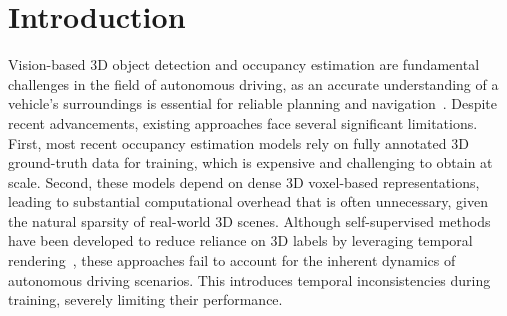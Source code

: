 \documentclass[10pt,twocolumn,letterpaper]{article}
\begin{document}
\section{Introduction}
Vision-based 3D object detection and occupancy estimation are fundamental challenges in the field of autonomous driving, as an accurate understanding of a vehicle's surroundings is essential for reliable planning and navigation~\cite{xu2025survey, shi2024grid, zhang2024vision}.
Despite recent advancements, existing approaches face several significant limitations.
First, most recent occupancy estimation models rely on fully annotated 3D ground-truth data for training, which is expensive and challenging to obtain at scale.
Second, these models depend on dense 3D voxel-based representations, leading to substantial computational overhead that is often unnecessary, given the natural sparsity of real-world 3D scenes.
Although self-supervised methods have been developed to reduce reliance on 3D labels by leveraging temporal rendering~\cite{huang2023selfocc, zhang2023occnerf}, these approaches fail to account for the inherent dynamics of autonomous driving scenarios. 
This introduces temporal inconsistencies during training, severely limiting their performance.
\end{document}
